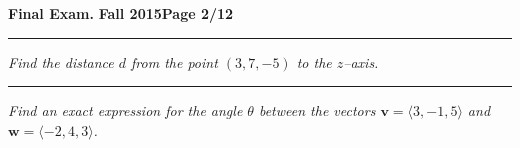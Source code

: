 \documentclass[12pt]{article}
\begin{document}
\newpage

\hfill{\large\bf Final Exam.}\hfill{\large\bf
  Fall 2015}\hfill{\large\bf Page 2/12}\hrule

\bigskip
{\problem[5 pts] \em  Find the distance $d$ from the point $(3,7,-5)$ to the $z$--axis.} 
\vspace{8.5cm}
\begin{flushright}
\end{flushright}
\hrule
{\problem[5 pts] \em Find an exact expression for the angle $\theta$ between
the vectors $\boldsymbol{v}=\langle 3, -1, 5\rangle$ and
$\boldsymbol{w}=\langle -2, 4, 3\rangle$.} 
\vspace{8.5cm}
\begin{flushright}
\end{flushright}
\newpage
\end{document}
